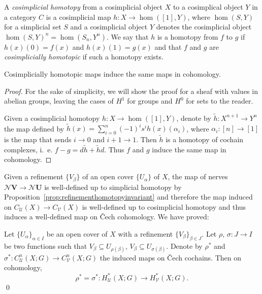 \documentclass[a4paper,openany]{scrbook}
\newcommand{\nerve}{\mathcal N}
\begin{document}
\begin{defn}
A \emph{cosimplicial homotopy} from a cosimplicial object $X$ to a cosimplical object $Y$ in a category $C$ is a cosimplicial map $h\colon X \to \hom([1],Y)$, where $\hom(S,Y)$ for a simplicial set $S$ and a cosimplicial object $Y$ denotes the cosimplicial object $\hom(S,Y)^n = \hom(S_n,Y^n)$. We say that $h$ is a homotopy from $f$ to $g$ if $h(x)(0)=f(x)$ and $h(x)(1)=g(x)$ and that $f$ and $g$ are \emph{cosimplicially homotopic} if such a homotopy exists.
\end{defn}

\begin{lemma}\label{lemma:cosimphomotopicmaps}
Cosimplicially homotopic maps induce the same maps in cohomology.
\end{lemma}
\begin{proof}
For the sake of simplicity, we will show the proof for a sheaf with values in abelian groups, leaving the cases of $H^1$ for groups and $H^0$ for sets to the reader.

Given a cosimplicial homotopy $h\colon X \to \hom([1],Y)$, denote by $\tilde h\colon X^{n+1} \to Y^n$ the map defined by $\tilde h(x) = \sum_{i=0}^n (-1)^i s^i h(x)(\alpha_i)$, where $\alpha_i\colon [n]\to[1]$ is the map that sends $i \to 0$ and $i+1 \to 1$. Then $\tilde h$ is a homotopy of cochain complexes, i.~e. $f-g = d\tilde h + \tilde h d$.  Thus $f$ and $g$ induce the same map in cohomology.
\end{proof}

Given a refinement $\{V_\beta\}$ of an open cover $\{U_\alpha\}$ of $X$, the map of nerves $\nerve \mathbf V \to \nerve \mathbf U$ is well-defined up to simplicial homotopy by Proposition~\ref{prop:refinementhomotopyinvariant} and therefore the map induced on $C_{\mathcal U}(X) \to C_{\mathcal V}(X)$ is well-defined up to cosimplicial homotopy and thus induces a well-defined map on Čech cohomology. We have proved:

\begin{thm}\label{thm:welldefinedrefinement}
Let $\{U_\alpha\}_{\alpha \in I}$ be an open cover of $X$ with a refinement $\{V_\beta\}_{\beta \in J}$. Let $\rho$, $\sigma\colon J \to I$ be two functions such that $V_{\beta} \subseteq U_{\rho(\beta)}$, $V_\beta \subseteq U_{\sigma(\beta)}$. Denote by $\rho^*$ and $\sigma^*\colon C^n_{\mathcal U}(X;G) \to C^n_{\mathcal V}(X;G)$ the induced maps on Čech cochains. Then on cohomology,
\[
\rho^* = \sigma^*\colon H^*_{\mathcal U}(X;G) \to H^*_{\mathcal V}(X;G).
\]\qed
\end{thm}
\end{document}
